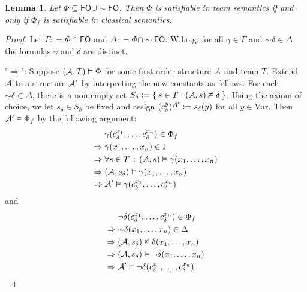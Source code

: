 \documentclass[a4paper,english,fleqn,11pt,final]{scrartcl}
\makeatletter
\newcommand{\Wloss}{W.l.o.g.\@\xspace}
\newcommand{\negg}{{\sim}}
\newcommand{\logic}[1]{\ensuremath{\mathsf{#1}}\xspace}
\newcommand{\FO}{\logic{FO}}
\newcommand{\Var}{\mathrm{Var}}
\newcommand{\calA}{\protect\ensuremath{\mathcal{A}}}
\providecommand{\dfn}{\mathrel{\mathop:}=}
\theoremstyle{plain}
\newtheorem{lemma}[theorem]{Lemma}
\theoremstyle{definition}
\makeatother
\begin{document}
\begin{lemma}
Let $\Phi \subseteq \FO \cup \negg\FO$. Then $\Phi$ is satisfiable in team semantics if and only if $\Phi_f$ is satisfiable in classical semantics.
\end{lemma}
\begin{proof}

Let $\Gamma \dfn \Phi \cap \FO$ and $\Delta \dfn \Phi \cap \negg\FO$.
\Wloss for all $\gamma \in \Gamma$ and $\negg \delta \in \Delta$ the formulas $\gamma$ and $\delta$ are distinct.

"$\Rightarrow$":
Suppose $(\calA,T)\vDash \Phi$ for some first-order structure $\calA$ and team $T$.
Extend $\calA$ to a structure $\calA'$ by interpreting the new constants as follows.
For each $\negg\delta \in \Delta$, there is a non-empty set $S_\delta \dfn \Set{ s \in T | (\calA,s)\nvDash \delta}$.
Using the axiom of choice, we let $s_\delta \in S_\delta$ be fixed and assign $(c^y_\delta)^{\calA'} \dfn s_\delta(y)$ for all $y \in \Var$.
Then $\calA' \vDash \Phi_f$ by the following argument:
\begin{align*}
	&\gamma(c^{x_1}_\delta, \ldots, c^{x_n}_\delta)  \in \Phi_f\\
	\Rightarrow \;&\gamma(x_1, \ldots, x_n) \in \Gamma\\
	\Rightarrow \;&\forall s \in T \,:\, (\calA, s) \vDash \gamma(x_1, \ldots, x_n)\\
	\Rightarrow \;&(\calA, s_\delta) \vDash \gamma(x_1, \ldots, x_n)\\
	\Rightarrow \;&\calA' \vDash \gamma(c^{x_1}_\delta, \ldots, c^{x_n}_\delta)
\end{align*}
and
\begin{align*}
	&\neg\delta(c^{x_1}_\delta, \ldots, c^{x_n}_\delta)  \in \Phi_f\\
	\Rightarrow \;&\negg\delta(x_1, \ldots, x_n) \in \Delta\\
	\Rightarrow \;&(\calA, s_\delta) \nvDash \delta(x_1, \ldots,x_n)\\
	\Rightarrow \;&(\calA, s_\delta) \vDash \neg\delta(x_1, \ldots,x_n)\\
	\Rightarrow \;&\calA' \vDash \neg\delta(c^{x_1}_\delta, \ldots, c^{x_n}_\delta)\text{.}
\end{align*}

\medskip


\end{proof}
\end{document}
